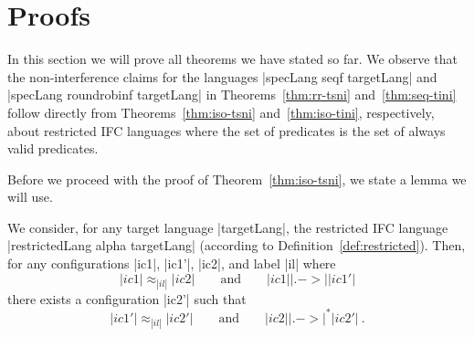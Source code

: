 \section{Proofs}
\label{sec:proofs}

In this section we will prove all theorems we have stated so far.
We observe that the non-interference claims for the languages
|specLang seqf targetLang| and |specLang roundrobinf targetLang|
in Theorems~\ref{thm:rr-tsni} and~\ref{thm:seq-tini} follow directly
from Theorems~\ref{thm:iso-tsni} and~\ref{thm:iso-tini},
respectively, about restricted IFC languages where the set
of predicates is the set of always valid predicates.

Before we proceed with the proof of Theorem~\ref{thm:iso-tsni},
we state a lemma we will use.

\begin{lemma}
  \label{lemma:rr-tsni-general}
  We consider, for any target language |targetLang|,
  the restricted IFC language |restrictedLang alpha targetLang|
  (according to Definition~\ref{def:restricted}).
  Then,
  for any configurations |ic1|, |ic1'|, |ic2|, and label |il| where
  \begin{equation} \label{eq:tsni-lemma-lhs}
  |ic1| \approx_{|il|} |ic2|
  \qquad \text{and} \qquad
  |ic1| |.->| |ic1'|
  \end{equation}
  there exists a configuration |ic2'| such that
  \begin{equation} \label{eq:tsni-lemma-rhs}
  |ic1'| \approx_{|il|} |ic2'|
  \qquad \text{and} \qquad
  |ic2| |.->|^* |ic2'|
  \ \text{.}
  \end{equation}
\end{lemma}

